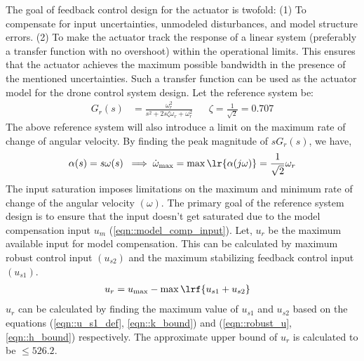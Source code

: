 The goal of feedback control design for the actuator is twofold:
(1) To compensate for input uncertainties, unmodeled disturbances, and model structure errors.
(2) To make the actuator track the response of a linear system (preferably a transfer function with no overshoot) within the operational limits. This ensures that the actuator achieves the maximum possible bandwidth in the presence of the mentioned uncertainties. Such a transfer function can be used as the actuator model for the drone control system design. Let the reference system be:
\begin{align*}
    G_{r}(s) &= \frac{\omega_{r}^2}{s^2 + 2s \zeta \omega_{r} + \omega_{r}^2}
    && \zeta = \frac{1}{\sqrt{2}} = 0.707
\end{align*}
The above reference system will also introduce a limit on the maximum rate of
change of angular velocity. By finding the peak magnitude of $s G_r(s)$, we have,
\begin{equation}
    \alpha(s) = s \omega(s) \;
    \implies \dot \omega_{\max} = \max \lr{\alpha(j \omega)}= \frac{1}{\sqrt{2}} \omega_r
\label{eqn::max_bandwidth}
\end{equation}
The input saturation imposes limitations on the maximum and minimum rate of
change of the angular velocity $(\omega)$. The primary goal of the reference
system design is to ensure that the input doesn't get saturated due to the
model compensation input $u_m$ (\ref{eqn::model_comp_input}). Let,
$u_{r}$ be the maximum available input for model compensation. This can be
calculated by maximum robust control input $(u_{s2})$ and the maximum
stabilizing feedback control input $(u_{s1})$.
\begin{align}
    u_{r} &= u_{\max} - \max {\lrf{u_{s1} + u_{s2}}}
\end{align}
$u_r$ can be calculated by finding the maximum value of $u_{s1}$ and $u_{s2}$
based on the equations (\ref{eqn::u_s1_def}, \ref{eqn::k_bound}) and
(\ref{eqn::robust_u}, \ref{eqn::h_bound}) respectively. The approximate upper
bound of $u_r$ is calculated to be $\leq 526.2$.

